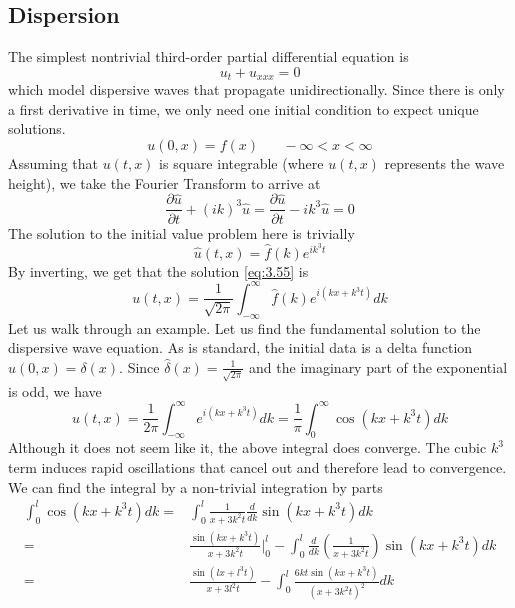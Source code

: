 \documentclass{article}
\newcommand{\pd}[2]{\frac{\partial #1}{\partial #2}}
\newcommand{\od}[2]{\frac{d #1}{d #2}}
\numberwithin{equation}{section}
\begin{document}
\subsection{Dispersion}
The simplest nontrivial third-order partial differential equation is 
\begin{equation}
    u_t + u_{xxx} = 0 \label{eq:3.55}
\end{equation}
which model dispersive waves that propagate unidirectionally. Since there is only a first derivative in time, we only need one initial condition to expect unique solutions.
\begin{equation*}
    u(0,x) = f(x) \hspace{20pt}-\infty < x <\infty
\end{equation*}
Assuming that $u(t,x)$ is square integrable (where $u(t,x)$ represents the wave height), we take the Fourier Transform to arrive at 
\begin{equation*}
    \pd{\hat{u}}{t} +(ik)^3\hat{u} = \pd{\hat{u}}{t} -ik^3\hat{u} = 0
\end{equation*}
The solution to the initial value problem here is trivially 
\begin{equation*}
    \hat{u}(t,x) = \hat{f}(k) e^{ik^3t}
\end{equation*}
By inverting, we get that the solution \eqref{eq:3.55} is 
\begin{equation}
    u(t,x) = \frac{1}{\sqrt{2\pi}} \int ^\infty_{-\infty} \hat{f}(k)e^{i(kx+k^3t)}dk
\end{equation}
Let us walk through an example. Let us find the fundamental solution to the dispersive wave equation. As is standard, the initial data is a delta function $u(0,x) = \delta (x)$. Since $\hat{\delta}(x) = \frac{1}{\sqrt{2\pi}}$ and the imaginary part of the exponential is odd, we have 
\begin{equation}
    u(t,x) = \frac{1}{2\pi}\int^\infty_{-\infty} e^{i(kx+k^3t)}dk = \frac{1}{\pi}\int^\infty_0 \cos(kx+k^3t)dk \label{eq:3.57}
\end{equation}
Although it does not seem like it, the above integral does converge. The cubic $k^3$ term induces rapid oscillations that cancel out and therefore lead to convergence. We can find the integral by a non-trivial integration by parts 
\begin{equation}
\begin{split}
    \int^l_0 \cos(kx+k^3t)dk =& \int^l_0\frac{1}{x+3k^2t}\od{}{k} \sin(kx+k^3t)dk\\
    =&\frac{\sin(kx+k^3t)}{x+3k^2t} \bigg|^l_0 -\int^l_0\od{}{k} \left( \frac{1}{x+3k^2t}\right)\sin(kx+k^3t)dk \\
    =&\frac{\sin(lx+l^3t)}{x+3l^2t} -\int^l_0 \frac{6kt\sin(kx+k^3t)}{(x+3k^2t)^2}dk
\end{split}
\end{equation}
\end{document}

